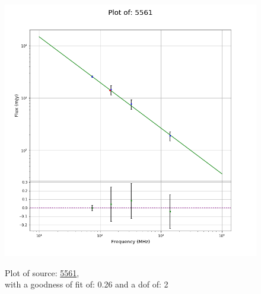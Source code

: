 \documentclass{article}
\begin{document}
\begin{figure}[H]
\begin{minipage}{0.5\textwidth}
        \includegraphics[scale = 0.35]{KmeulenSimSource_1hr/1hr5561.png}
        \captionsetup{labelformat=empty}
        \caption{Plot of source: \href{http://banana.transientskp.org/r4/vlo_KmeulenSimSource/runningcatalog/5561}{5561},\\with a goodness of fit of: 0.26 and a dof of: 2}
    \addtocounter{figure}{-1}
    \label{KmeulenSimSource:1hr:5561:plot}
    \end{minipage}
\end{figure}
\end{document}
